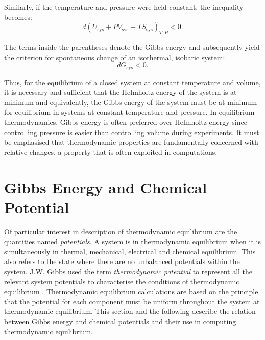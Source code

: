     Similarly, if the temperature and pressure were held constant, the inequality becomes:
    \begin{equation}
        d{\left(U_\text{sys} + PV_\text{sys} - TS_\text{sys} \right)_{T,P}} < 0.
    \end{equation}

    The terms inside the parentheses denote the Gibbs energy and subsequently yield the criterion for spontaneous change of an isothermal, isobaric system:
    \begin{equation}
        d{G_\text{sys} } < 0.
    \end{equation}

    Thus, for the equilibrium of a closed system at constant temperature and volume, it is necessary and sufficient that the Helmholtz energy of the system is at minimum and equivalently, the Gibbs energy of the system must be at minimum for equilibrium in systems at constant temperature and pressure. In equilibrium thermodynamics, Gibbs energy is often preferred over Helmholtz energy since controlling pressure is easier than controlling volume during experiments. It must be emphasised that thermodynamic properties are fundamentally concerned with relative changes, a property that is often exploited in computations.

\section{Gibbs Energy and Chemical Potential}
    Of particular interest in description of  thermodynamic equilibrium are the quantities named \emph{potentials}. A system is in thermodynamic equilibrium when it is simultaneously in thermal, mechanical, electrical and chemical equilibrium. This also refers to the state where there are no unbalanced potentials within the system. J.W. Gibbs used the term \emph{thermodynamic potential} to represent all the relevant system potentials to characterise the conditions of thermodynamic equilibrium \cite{Gibbs:1878aa}. Thermodynamic equilibrium calculations are based on the principle that the potential for each component must be uniform throughout the system at thermodynamic equilibrium. This section and the following describe the relation between Gibbs energy and chemical potentials and their use in computing thermodynamic equilibrium.

